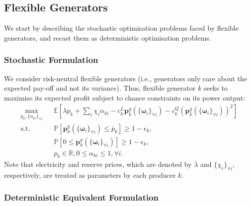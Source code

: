\documentclass{article}
\begin{document}
\subsection{Flexible Generators}

We start by describing the stochastic optimisation problems faced by flexible generators, and recast them as deterministic optimisation problems.

\subsubsection{Stochastic Formulation}

We consider risk-neutral flexible generators (i.e., generators only care about the expected pay-off and not its variance). Thus, flexible generator $k$ seeks to maximise its expected profit subject to chance constraints on its power output:
\begin{align}
\underset{p_k, \{\alpha_{ki}\}_{\forall i}}{\max} \hspace{10pt} & \mathbb{E}[\lambda p_k + \sum_i \chi_i \alpha_{ki} - c_k^L \mathbf{p}_k^g(\{\boldsymbol{\omega}_i\}_{\forall i}) - c_k^Q (\mathbf{p}_k^g(\{\boldsymbol{\omega}_i\}_{\forall i}))^2]\\
\mbox{s.t. } & \mathbb{P}[\mathbf{p}_k^g(\{\boldsymbol{\omega}_i\}_{\forall i}) \le \overline{p}_k] \ge 1 - \epsilon_k,\\
& \mathbb{P}[0 \le \mathbf{p}_k^g(\{\boldsymbol{\omega}_i\}_{\forall i})] \ge 1 - \epsilon_k,\\
&p_k \in \mathbb{R}, 0 \le \alpha_{ki} \le 1, \forall i.
\end{align}
Note that electricity and reserve prices, which are denoted by $\lambda$ and $\{\chi_i\}_{\forall i}$, respectively, are treated as parameters by each producer $k$.
\subsubsection{Deterministic Equivalent Formulation}
\end{document}
